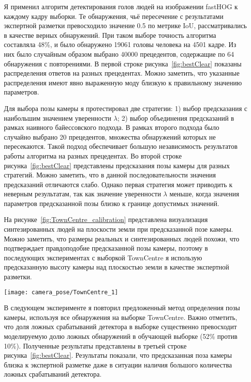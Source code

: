 Я применил алгоритм детектирования голов людей на изображении fastHOG \cite{prisacariu2009fasthog} к каждому кадру выборки. Те обнаружения, чьё пересечение с результатами экспертной разметки превосходило значение 0.5 по метрике IoU, рассматривались в качестве верных обнаружений. При таком выборе точность алгоритма составляла 48\%, и было обнаружено 19061 головы человека на 4501 кадре. Из них было случайным образом выбрано 40000 прецедентов, содержащие по 64 обнаружения с повторениями. В первой строке рисунка~\ref{fig:bestClear} показаны распределения ответов на разных прецедентах. Можно заметить, что указанные распределения имеют явно выраженную моду близкую к правильному значению параметров.

Для выбора позы камеры я протестировал две стратегии: 1) выбор предсказания с наибольшим значением уверенности $\lambda$; 2) выбор объединения предсказаний в рамках наивного байессовского подхода. В рамках второго подхода было случайно выбрано 20 прецедентов, множества обнаружений которых не пересекаются. Такой подход обеспечивает большую независимость результатов работы алгоритма на разных прецедентах. Во второй строке рисунка~\ref{fig:bestClear} представлены предсказания позы камеры для разных стратегий. Можно заметить, что в данной последовательности значения предсказаний отличаются слабо. Однако первая стратегия может приводить к неверным результатам, так как значение уверенности $\lambda$ меньше, когда значения параметров предсказанной позы близко к границе допустимых значений.

На рисунке~\ref{fig:TownCentre_calibration} представлена визуализация синтезированных людей на плоскости земли при предсказанной позе камеры. Можно заметить, что размеры реальных и синтезированных людей похожи, что подтверждает правдоподобие предсказанной позы камеры, поэтому в последующих экспериментах с выборкой TownCentre я использую предсказанную высоту камеры над плоскостью земли в качестве экспертной разметки.

\begin{figure*}[!t]
	\centering
	\texttt{[image: camera\_pose/TownCentre\_1]}
	\caption{Визуализация синтезированных людей на предсказанной плоскости земли.}
	\label{fig:TownCentre_calibration}
\end{figure*}

В следующем эксперименте я повторил предложенный метод определения позы камеры, используя все обнаружения на выборке TownCentre. Важно отметить, что доля ложных срабатываний детектора в выборке существенно превосходит моделируемую долю ложных обнаружений в обучающей выборке (52\% против 10\%). Полученные результаты представлены в третьей строке рисунка~\ref{fig:bestClear}. Результаты показали, что предсказанная поза камеры близка к экспертной разметке даже в ситуации наличия большого количества ложных срабатываний детектора.

